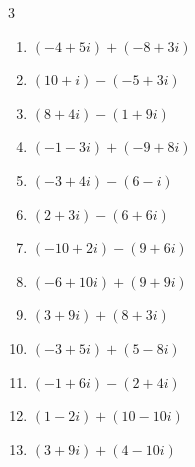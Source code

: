 \begin{multicols}{3}
\begin{enumerate}
        \phantom{$\displaystyle =8+10i$}

  \item $\displaystyle (-4+5i) + (-8+3i)$

        \phantom{$\displaystyle =-12+8i$}

  \item $\displaystyle (10+i) - (-5+3i)$

        \phantom{$\displaystyle =15-2i$}

  \item $\displaystyle (8+4i) - (1+9i)$

        \phantom{$\displaystyle =7-5i$}

  \item $\displaystyle (-1-3i) + (-9+8i)$

        \phantom{$\displaystyle =-10+5i$}

  \item $\displaystyle (-3+4i) - (6-i)$

        \phantom{$\displaystyle =-9+5i$}

  \item $\displaystyle (2+3i) - (6+6i)$

        \phantom{$\displaystyle =-4-3i$}

  \item $\displaystyle (-10+2i) - (9+6i)$

        \phantom{$\displaystyle =-19-4i$}

  \item $\displaystyle (-6+10i) + (9+9i)$

        \phantom{$\displaystyle =3+19i$}

  \item $\displaystyle (3+9i) + (8+3i)$

        \phantom{$\displaystyle =11+12i$}

  \item $\displaystyle (-3+5i) + (5-8i)$

        \phantom{$\displaystyle =2-3i$}

  \item $\displaystyle (-1+6i) - (2+4i)$

        \phantom{$\displaystyle =-3+2i$}

  \item $\displaystyle (1-2i) + (10-10i)$

        \phantom{$\displaystyle =11-12i$}

  \item $\displaystyle (3+9i) + (4-10i)$


\end{enumerate}
\end{multicols}
